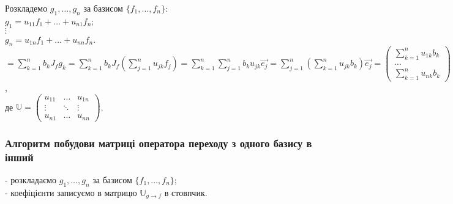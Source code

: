 \documentclass[a4paper, 10pt]{article}
\def\huge{\displaystyle}
\theoremstyle{theoremdd}
\theoremstyle{theoremdd}
\theoremstyle{theoremdd}
\theoremstyle{theoremdd}
\theoremstyle{theoremdd}
\theoremstyle{theoremdd}
\theoremstyle{theoremdd}
\theoremstyle{theoremdd}
\begin{document}
Розкладемо $g_1,\dots,g_n$ за базисом $\{f_1,\dots, f_n\}$:\\
$g_1 = u_{11}f_1 + \dots + u_{n1}f_n$;\\
$\vdots$\\
$g_n = u_{1n}f_1 + \dots + u_{nn}f_n$.\\
$\boxed{=} \huge \sum_{k=1}^n b_k J_f g_k = \sum_{k=1}^n b_k J_f \left(\sum_{j=1}^n u_{jk} f_j\right) = \sum_{k=1}^n \sum_{j=1}^n b_k u_{jk} \vec{e_j} = \sum_{j=1}^n \left(\sum_{k=1}^n u_{jk} b_k \right) \vec{e_j} = \begin{pmatrix}
 \huge \sum_{k=1}^n u_{1k} b_k \\ \dots \\ \huge \sum_{k=1}^n u_{nk} b_k
\end{pmatrix} = \mathbb{U} \vec{x_g}$,\\
де $\mathbb{U} = \begin{pmatrix}
u_{11} & \dots & u_{1n} \\
\vdots & \ddots & \vdots \\
u_{n1} & \dots & u_{nn}
\end{pmatrix}$.
\subsubsection*{Алгоритм побудови матриці оператора переходу з одного базису в інший}
- розкладаємо $g_1,\dots,g_n$ за базисом $\{f_1,\dots,f_n\}$;\\
- коефіцієнти записуємо в матрицю $\mathbb{U}_{g \to f}$ в стовпчик.
\end{document}

